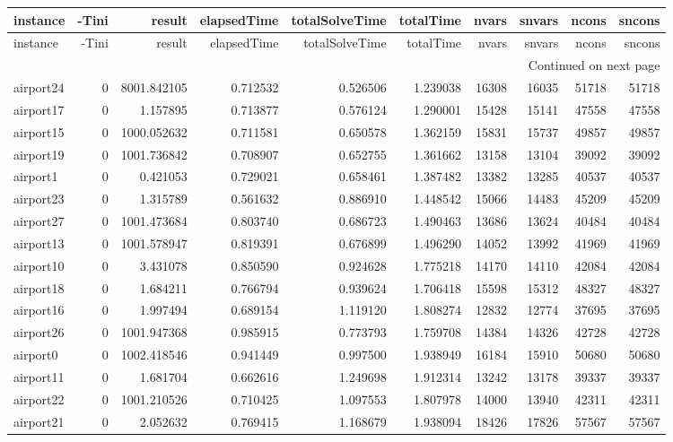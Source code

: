 \begin{longtable}{|l|r|r|r|r|r|r|r|r|r|}
\toprule
instance & -Tini & result & elapsedTime & totalSolveTime & totalTime & nvars & snvars & ncons & sncons \\
\midrule
\endfirsthead
\toprule
instance & -Tini & result & elapsedTime & totalSolveTime & totalTime & nvars & snvars & ncons & sncons \\
\midrule
\endhead
\midrule
\multicolumn{10}{r}{Continued on next page} \\
\midrule
\endfoot
\bottomrule
\endlastfoot
airport24 & 0 & 8001.842105 & 0.712532 & 0.526506 & 1.239038 & 16308 & 16035 & 51718 & 51718 \\
airport17 & 0 & 1.157895 & 0.713877 & 0.576124 & 1.290001 & 15428 & 15141 & 47558 & 47558 \\
airport15 & 0 & 1000.052632 & 0.711581 & 0.650578 & 1.362159 & 15831 & 15737 & 49857 & 49857 \\
airport19 & 0 & 1001.736842 & 0.708907 & 0.652755 & 1.361662 & 13158 & 13104 & 39092 & 39092 \\
airport1 & 0 & 0.421053 & 0.729021 & 0.658461 & 1.387482 & 13382 & 13285 & 40537 & 40537 \\
airport23 & 0 & 1.315789 & 0.561632 & 0.886910 & 1.448542 & 15066 & 14483 & 45209 & 45209 \\
airport27 & 0 & 1001.473684 & 0.803740 & 0.686723 & 1.490463 & 13686 & 13624 & 40484 & 40484 \\
airport13 & 0 & 1001.578947 & 0.819391 & 0.676899 & 1.496290 & 14052 & 13992 & 41969 & 41969 \\
airport10 & 0 & 3.431078 & 0.850590 & 0.924628 & 1.775218 & 14170 & 14110 & 42084 & 42084 \\
airport18 & 0 & 1.684211 & 0.766794 & 0.939624 & 1.706418 & 15598 & 15312 & 48327 & 48327 \\
airport16 & 0 & 1.997494 & 0.689154 & 1.119120 & 1.808274 & 12832 & 12774 & 37695 & 37695 \\
airport26 & 0 & 1001.947368 & 0.985915 & 0.773793 & 1.759708 & 14384 & 14326 & 42728 & 42728 \\
airport0 & 0 & 1002.418546 & 0.941449 & 0.997500 & 1.938949 & 16184 & 15910 & 50680 & 50680 \\
airport11 & 0 & 1.681704 & 0.662616 & 1.249698 & 1.912314 & 13242 & 13178 & 39337 & 39337 \\
airport22 & 0 & 1001.210526 & 0.710425 & 1.097553 & 1.807978 & 14000 & 13940 & 42311 & 42311 \\
airport21 & 0 & 2.052632 & 0.769415 & 1.168679 & 1.938094 & 18426 & 17826 & 57567 & 57567 \\

\end{longtable}
